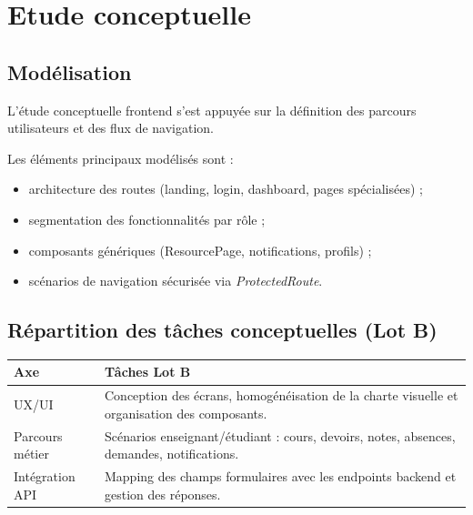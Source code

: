 \chapter{Etude conceptuelle}

\section*{Modélisation}
L'étude conceptuelle frontend s'est appuyée sur la définition des parcours utilisateurs et des flux de navigation.

Les éléments principaux modélisés sont :
\begin{itemize}
	\item architecture des routes (landing, login, dashboard, pages spécialisées) ;
	\item segmentation des fonctionnalités par rôle ;
	\item composants génériques (ResourcePage, notifications, profils) ;
	\item scénarios de navigation sécurisée via \textit{ProtectedRoute}.
\end{itemize}

\section*{Répartition des tâches conceptuelles (Lot B)}
\begin{tabularx}{\textwidth}{lX}
\toprule
\textbf{Axe} & \textbf{Tâches Lot B} \\
\midrule
UX/UI & Conception des écrans, homogénéisation de la charte visuelle et organisation des composants. \\
Parcours métier & Scénarios enseignant/étudiant : cours, devoirs, notes, absences, demandes, notifications. \\
Intégration API & Mapping des champs formulaires avec les endpoints backend et gestion des réponses. \\
\bottomrule
\end{tabularx}
